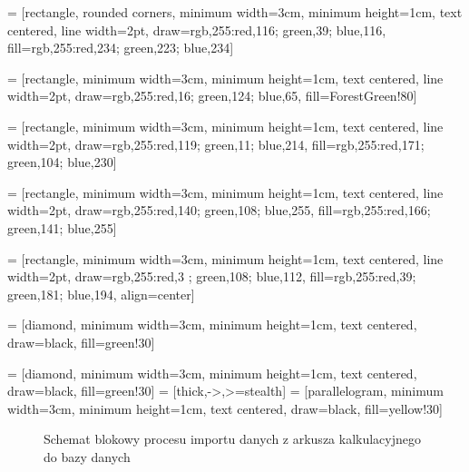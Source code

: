 {} = [rectangle, rounded corners, minimum width=3cm, minimum height=1cm, text centered, line width=2pt, draw={rgb,255:red,116; green,39; blue,116}, fill={rgb,255:red,234; green,223; blue,234}]

 = [rectangle, minimum width=3cm, minimum height=1cm, text centered, line width=2pt, draw={rgb,255:red,16; green,124; blue,65}, fill=ForestGreen!80]

 = [rectangle, minimum width=3cm, minimum height=1cm, text centered, line width=2pt, draw={rgb,255:red,119; green,11; blue,214}, fill={rgb,255:red,171; green,104; blue,230}]

 = [rectangle, minimum width=3cm, minimum height=1cm, text centered, line width=2pt, draw={rgb,255:red,140; green,108; blue,255}, fill={rgb,255:red,166; green,141; blue,255}]

 = [rectangle, minimum width=3cm, minimum height=1cm, text centered, line width=2pt, draw={rgb,255:red,3 ; green,108; blue,112}, fill={rgb,255:red,39; green,181; blue,194}, align=center]

 = [diamond, minimum width=3cm, minimum height=1cm, text centered, draw=black, fill=green!30]

 = [diamond, minimum width=3cm, minimum height=1cm, text centered, draw=black, fill=green!30]
 = [thick,->,>=stealth]
 = [parallelogram, minimum width=3cm, minimum height=1cm, text centered, draw=black, fill=yellow!30]
\begin{figure}
\resizebox{0.95\textwidth}{!}{%

}
\caption{Schemat blokowy procesu importu danych z arkusza kalkulacyjnego do bazy danych}
\label{fig:flowchart}
\end{figure}

